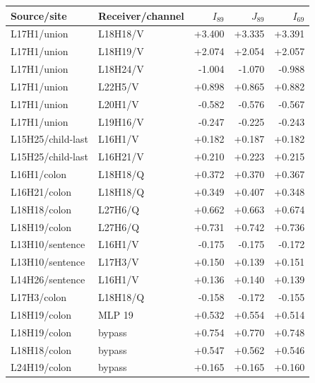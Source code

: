 \begin{tabular}{llrrr}
\toprule
Source/site & Receiver/channel & $I_{89}$ & $J_{89}$ & $I_{69}$ \\
\midrule
L17H1/union & L18H18/V & +3.400 & +3.335 & +3.391 \\
L17H1/union & L18H19/V & +2.074 & +2.054 & +2.057 \\
L17H1/union & L18H24/V & -1.004 & -1.070 & -0.988 \\
L17H1/union & L22H5/V & +0.898 & +0.865 & +0.882 \\
L17H1/union & L20H1/V & -0.582 & -0.576 & -0.567 \\
L17H1/union & L19H16/V & -0.247 & -0.225 & -0.243 \\
L15H25/child-last & L16H1/V & +0.182 & +0.187 & +0.182 \\
L15H25/child-last & L16H21/V & +0.210 & +0.223 & +0.215 \\
L16H1/colon & L18H18/Q & +0.372 & +0.370 & +0.367 \\
L16H21/colon & L18H18/Q & +0.349 & +0.407 & +0.348 \\
L18H18/colon & L27H6/Q & +0.662 & +0.663 & +0.674 \\
L18H19/colon & L27H6/Q & +0.731 & +0.742 & +0.736 \\
L13H10/sentence & L16H1/V & -0.175 & -0.175 & -0.172 \\
L13H10/sentence & L17H3/V & +0.150 & +0.139 & +0.151 \\
L14H26/sentence & L16H1/V & +0.136 & +0.140 & +0.139 \\
L17H3/colon & L18H18/Q & -0.158 & -0.172 & -0.155 \\
L18H19/colon & MLP 19 & +0.532 & +0.554 & +0.514 \\
L18H19/colon & bypass & +0.754 & +0.770 & +0.748 \\
L18H18/colon & bypass & +0.547 & +0.562 & +0.546 \\
L24H19/colon & bypass & +0.165 & +0.165 & +0.160 \\
\bottomrule
\end{tabular}

